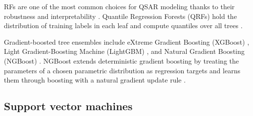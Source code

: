 RFs are one of the most common choices for QSAR modeling thanks to their robustness and interpretability \citep{Svetnik2003}. Quantile Regression Forests (QRFs) hold the distribution of training labels in each leaf and compute quantiles over all trees \citep{Meinshausen2006}.

Gradient-boosted tree ensembles include eXtreme Gradient Boosting (XGBoost) \citep{Mustapha2016, Tian2022}, Light Gradient-Boosting Machine (LightGBM) \citep{ke2017lightgbm}, and Natural Gradient Boosting (NGBoost) \citep{Duan2020}. NGBoost extends deterministic gradient boosting by treating the parameters of a chosen parametric distribution as regression targets and learns them through boosting with a natural gradient update rule \citep{Duan2020}.


\subsection{Support vector machines}

